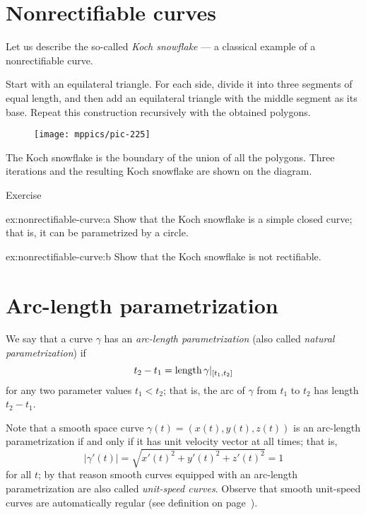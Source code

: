 \section{Nonrectifiable curves}

Let us describe the so-called \emph{Koch snowflake} ---
a classical example of a nonrectifiable curve.

Start with an equilateral triangle.
For each side, divide it into three segments of equal length, and then add an equilateral triangle with the middle segment as its base.
Repeat this construction recursively with the obtained polygons.
\begin{figure}[h!]
\centering
\texttt{[image: mppics/pic-225]}
\end{figure}
The Koch snowflake is the boundary of the union of all the polygons.
Three iterations and the resulting Koch snowflake are shown on the diagram.



\begin{thm}{Exercise}\label{ex:nonrectifiable-curve}

\begin{subthm}{ex:nonrectifiable-curve:a} Show that the Koch snowflake is a simple closed curve; that is, it can be parametrized by a circle.
\end{subthm}


\begin{subthm}{ex:nonrectifiable-curve:b} Show that the Koch snowflake is not rectifiable. 
\end{subthm}
\end{thm}
  
  
\section{Arc-length parametrization}

We say that a curve $\gamma$ has an \emph{arc-length parametrization} (also called \emph{natural parametrization})
if 
\[t_2-t_1=\mathop{\rm length}\nolimits \gamma|_{[t_1,t_2]}\]
for any two parameter values $t_1<t_2$;
that is, the arc of $\gamma$ from $t_1$ to $t_2$ has length $t_2-t_1$.

Note that a smooth space curve $\gamma(t)=(x(t),y(t),z(t))$ is an arc-length parametrization if and only if it has unit velocity vector at all times;
that is, 
\[|\gamma'(t)|=\sqrt{x'(t)^2+y'(t)^2+z'(t)^2}=1\]
for all $t$; by that reason smooth curves equipped with an arc-length parametrization are also called \emph{unit-speed curves}.
Observe that smooth unit-speed curves are automatically regular (see definition on page~\pageref{page:regular curve}).

